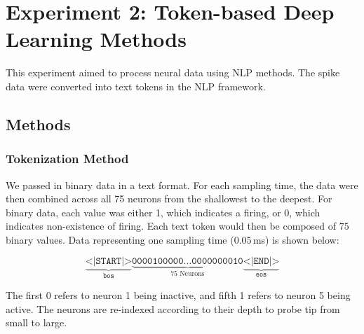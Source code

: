 \documentclass[../CLthesis.tex]{subfiles}
\begin{document}
\chapter{Experiment 2: Token-based Deep Learning Methods}%
\label{exp:\theexperiment}
This experiment aimed to process neural data using NLP methods. The spike data were converted into text tokens in the NLP framework.

\section{Methods}
\subsection{Tokenization Method}
We passed in binary data in a text format. For each sampling time, the data were then combined across all 75 neurons from the shallowest to the deepest. For binary data, each value was either 1, which indicates a firing, or 0, which indicates non-existence of firing. Each text token would then be composed of $75$ binary values. Data representing one sampling time ($0.05$\,ms) is shown below:

\begin{equation*}
\underbrace{\texttt{<|START|>}}_{\texttt{bos}}\underbrace{\texttt{0000100000...0000000010}}_{75\text{ Neurons}}\underbrace{\texttt{<|END|>}}_{\texttt{eos}}
\end{equation*}

The first 0 refers to neuron 1 being inactive, and fifth 1 refers to neuron 5 being active. The neurons are re-indexed according to their depth to probe tip from small to large. 
\end{document}
